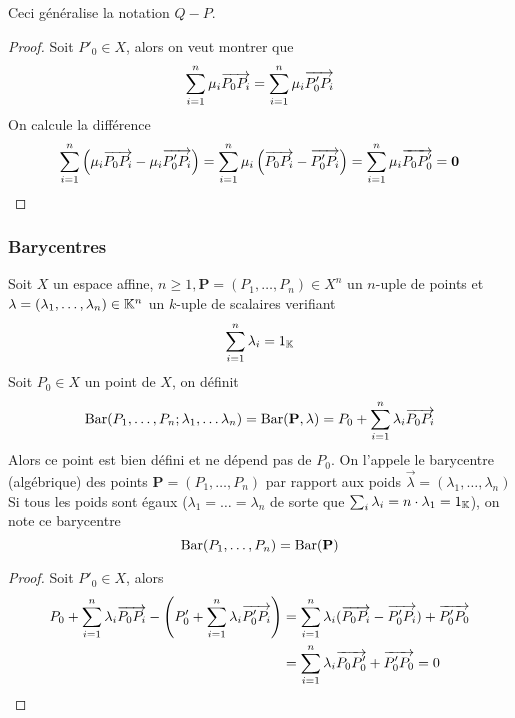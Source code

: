 \begin{remark}
	Ceci généralise la notation $Q - P$.
\end{remark}

\begin{proof}
	Soit $P'_0 \in X$, alors on veut montrer que
	\begin{equation*}
		\sum_{i=1}^n \mu_i \overrightarrow{P_0 P_i} = \sum_{i=1}^n \mu_i \overrightarrow{P'_0 P_i}
	\end{equation*}
	On calcule la différence
	\begin{equation*}
		\sum_{i=1}^n \left(\mu_i \overrightarrow{P_0 P_i} - \mu_i \overrightarrow{P'_0 P_i}\right) =
		\sum_{i=1}^n \mu_i\left(\overrightarrow{P_0 P_i} - \overrightarrow{P'_0 P_i}\right) = 
		\sum_{i=1}^n \mu_i \overrightarrow{P_0 P'_0} = \mathbf{0}
	\end{equation*}
\end{proof}

\subsubsection{Barycentres}

\begin{proposition}
	Soit $X$ un espace affine, $n \geq 1, \mathbf{P} = (P_1, \dots, P_n) \in X^n$ un
	$n$-uple de points et $\mathbf{\lambda} = (\lambda_1, \dots, \lambda_n) \in \mathbb{K}^n$ un
	$k$-uple de scalaires verifiant
	\begin{equation*}
		\sum_{i=1}^n \lambda_i = 1_{\mathbb{K}}
	\end{equation*}
	Soit $P_0 \in X$ un point de $X$, on définit
	\begin{equation*}
		\operatorname{Bar}(P_1, \dots, P_n; \lambda_1, \dots \lambda_n)
		= \operatorname{Bar}(\mathbf{P}, \mathbf{\lambda}) = P_0 + \sum_{i=1}^n \lambda_i \overrightarrow{P_0P_i}
	\end{equation*}
	Alors ce point est bien défini et ne dépend pas de $P_0$. On
	l'appele le barycentre (algébrique) des
	points $\mathbf{P} = (P_1, \dots, P_n)$ par rapport aux poids $\vec{\lambda}
	= (\lambda_1, \dots, \lambda_n)$
	Si tous les poids sont égaux ($\lambda_1 = \dots = \lambda_n$ de sorte que
	$\sum_{i} \lambda_i = n \cdot \lambda_1 = 1_{\mathbb{K}}$), on note ce barycentre
	\begin{equation*}
		\operatorname{Bar}(P_1, \dots, P_n) = \operatorname{Bar}(\mathbf{P})
	\end{equation*}
\end{proposition}

\begin{proof}
	Soit $P'_0 \in X$, alors 
	\begin{align*}
		P_0 + \sum_{i=1}^n \lambda_i \overrightarrow{P_0P_i} - \left(P'_0 + \sum_{i=1}^n \lambda_i
		\overrightarrow{P'_0P_i} \right) &= \sum_{i=1}^n \lambda_i (\overrightarrow{P_0P_i} - \overrightarrow{P'_0P_i}) +
		\overrightarrow{P'_0P_0} \\
		&= \sum_{i=1}^n \lambda_i \overrightarrow{P_0P'_0} + \overrightarrow{P'_0P_0} = 0
	\end{align*}
\end{proof}

